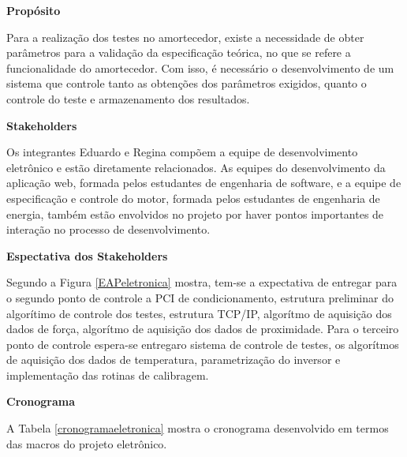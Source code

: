 	\textbf{Propósito}

	Para a realização dos testes no amortecedor, existe a necessidade de obter parâmetros para a validação da especificação teórica, no que se refere a funcionalidade do amortecedor. Com isso, é necessário o desenvolvimento de um sistema que controle tanto as obtenções dos parâmetros exigidos, quanto o controle do teste e armazenamento dos resultados.

	\textbf{Stakeholders}

	Os integrantes Eduardo e Regina compõem a equipe de desenvolvimento eletrônico e estão diretamente relacionados. As equipes do desenvolvimento da aplicação web, formada pelos estudantes de engenharia de software, e a equipe de especificação e controle do motor, formada pelos estudantes de engenharia de energia, também estão envolvidos no projeto por haver pontos importantes de interação no processo de desenvolvimento.

	\textbf{Espectativa dos Stakeholders}

	Segundo a Figura \ref{EAPeletronica} mostra, tem-se a expectativa de entregar para o segundo ponto de controle a PCI de condicionamento, estrutura preliminar do algorítimo de controle dos testes, estrutura TCP/IP, algorítmo de aquisição dos dados de força, algorítmo de aquisição dos dados de proximidade.
	Para o terceiro ponto de controle espera-se entregaro sistema de controle de testes, os algorítmos de aquisição dos dados de temperatura, parametrização do inversor e implementação das rotinas de calibragem.

	\textbf{Cronograma}

	A Tabela \ref{cronogramaeletronica} mostra o cronograma desenvolvido em termos das macros do projeto eletrônico.

